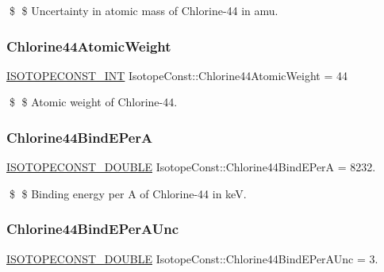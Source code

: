 \$ \$ Uncertainty in atomic mass of Chlorine-\/44 in amu. \mbox{\label{group___isotope_const-_chlorine-_cl44_ga0312be03f20efadc0fd5e320f1112e36}} 
\subsubsection{\texorpdfstring{Chlorine44\+Atomic\+Weight}{Chlorine44AtomicWeight}}
{\footnotesize\ttfamily \mbox{\hyperlink{group___isotope_const-_macros_ga5f18360b3e99483a35c32d789e62621c}{I\+S\+O\+T\+O\+P\+E\+C\+O\+N\+S\+T\+\_\+\+I\+NT}} Isotope\+Const\+::\+Chlorine44\+Atomic\+Weight = 44}

\$ \$ Atomic weight of Chlorine-\/44. \mbox{\label{group___isotope_const-_chlorine-_cl44_ga284eb0cbde8a3109fd0e9c3016d1d8b2}} 
\subsubsection{\texorpdfstring{Chlorine44\+Bind\+E\+PerA}{Chlorine44BindEPerA}}
{\footnotesize\ttfamily \mbox{\hyperlink{group___isotope_const-_macros_ga8f45a7272ce02c0b4c65c44636ed719a}{I\+S\+O\+T\+O\+P\+E\+C\+O\+N\+S\+T\+\_\+\+D\+O\+U\+B\+LE}} Isotope\+Const\+::\+Chlorine44\+Bind\+E\+PerA = 8232.}

\$ \$ Binding energy per A of Chlorine-\/44 in keV. \mbox{\label{group___isotope_const-_chlorine-_cl44_ga70c9a435bb9e39019767ad5e8a261578}} 
\subsubsection{\texorpdfstring{Chlorine44\+Bind\+E\+Per\+A\+Unc}{Chlorine44BindEPerAUnc}}
{\footnotesize\ttfamily \mbox{\hyperlink{group___isotope_const-_macros_ga8f45a7272ce02c0b4c65c44636ed719a}{I\+S\+O\+T\+O\+P\+E\+C\+O\+N\+S\+T\+\_\+\+D\+O\+U\+B\+LE}} Isotope\+Const\+::\+Chlorine44\+Bind\+E\+Per\+A\+Unc = 3.}

